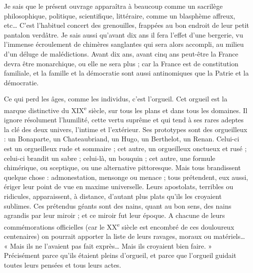\documentclass[french,twoside]{book} %
\begin{document}
Je sais que le présent ouvrage apparaîtra à beaucoup comme un sacrilège philosophique, politique, scientifique, littéraire, comme un blasphème affreux, etc… C’est l’habituel concert des grenouilles, frappées au bon endroit de leur petit pantalon verdâtre. Je sais aussi qu’avant dix ans il fera l’effet d’une bergerie, vu l’immense écroulement de chimères sanglantes qui sera alors accompli, au milieu d’un déluge de malédictions. Avant dix ans, avant cinq ans peut-être la France devra être monarchique, ou elle ne sera plus ; car la France est de constitution familiale, et la famille et la démocratie sont aussi antinomiques que la Patrie et la démocratie.\par
Ce qui perd les âges, comme les individus, c’est l’orgueil. Cet orgueil est la marque distinctive du XIX\textsuperscript{e} siècle, sur tous les plans et dans tous les domaines. Il ignore résolument l’humilité, cette vertu suprême et qui tend à ses rares adeptes la clé des deux univers, l’intime et l’extérieur. Ses prototypes sont des orgueilleux : un Bonaparte, un Chateaubriand, un Hugo, un Berthelot, un Renan. Celui-ci est un orgueilleux rude et sommaire ; cet autre, un orgueilleux onctueux et rusé ; celui-ci brandit un sabre ; celui-là, un bouquin ; cet autre, une formule chimérique, ou sceptique, ou une alternative pittoresque. Mais tous brandissent quelque chose : admonestation, mensonge ou menace ; tous prétendent, eux aussi, ériger leur point de vue en maxime universelle. Leurs apostolats, terribles ou ridicules, apparaissent, à distance, d’autant plus plats qu’ils les croyaient sublimes. Ces prétendus géants sont des nains, quant au bon sens, des nains agrandis par leur miroir ; et ce miroir fut leur époque. A chacune de leurs commémorations officielles (car le XX\textsuperscript{e} siècle est encombré de ces douloureux centenaires) on pourrait apporter la liste de leurs ravages, moraux ou matériels… « Mais ils ne l’avaient pas fait exprès… Mais ils croyaient bien faire. » Précisément parce qu’ils étaient pleins d’orgueil, et parce que l’orgueil guidait toutes leurs pensées et tous leurs actes.\par
\end{document}

